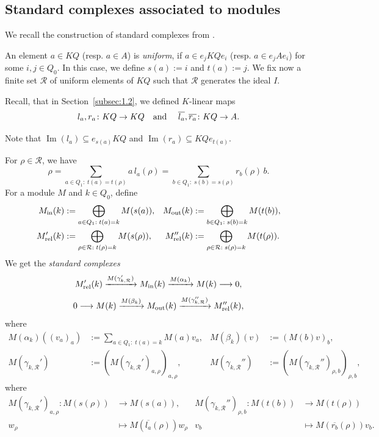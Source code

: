 \documentclass[12pt,reqno]{amsart}
\theoremstyle{definition}
\newcommand{\df}{\colon}
\newcommand{\cR}{{\mathcal R}}
\newcommand{\Ima}{\operatorname{Im}}
\begin{document}
\subsection{Standard complexes associated to modules}
We recall the construction of standard complexes from \cite{GHLS26}.

An element $a \in KQ$ (resp. $a \in A$) is \emph{uniform}, if $a \in e_jKQe_i$ (resp. $a \in e_jAe_i$) for
some $i,j \in Q_0$.
In this case, we define $s(a) := i$ and $t(a) := j$.
We fix now a finite set
$
\cR
$ of uniform elements of $KQ$ such that $\cR$ generates the ideal $I$.

Recall, that in Section~\ref{subsec:1.2}, we defined $K$-linear maps
$$
l_a,r_a\df KQ \to KQ
\text{\quad and \quad}
\overline{l_a},\overline{r_a}\df KQ \to A.
$$

Note that $\Ima(l_a) \subseteq  e_{s(a)}KQ$ and 
$\Ima(r_a) \subseteq KQe_{t(a)}$.

For $\rho \in \cR$, we have
\[
\rho = \sum_{a \in Q_1 : \; t(a)=t(\rho)} a\,l_a(\rho)
= \sum_{b \in Q_1 : \; s(b)=s(\rho)} r_b(\rho)\,b.
\]
For a module $M$ and $k \in Q_0$, define
\[
\begin{aligned}
M_{\rm in}(k)
&:= \bigoplus_{a \in Q_1 : \; t(a)=k} M(s(a)),
&
M_{\rm out}(k)
&:= \bigoplus_{b \in Q_1 : \; s(b)=k} M(t(b)),\\
M'_{\rm rel}(k)
&:= \bigoplus_{\rho \in \cR : \; t(\rho)=k} M(s(\rho)),
&
M''_{\rm rel}(k)
&:= \bigoplus_{\rho \in \cR : \; s(\rho)=k} M(t(\rho)).
 \end{aligned}
\]
We get the \emph{standard complexes} 
\[
 M_{\rm rel}'(k)\xrightarrow{M(\gamma_{k,\cR}')}
 M_{\rm in}(k)\xrightarrow{M(\alpha_k)}M(k)\longrightarrow0,
\]
\[
 0\longrightarrow M(k)\xrightarrow{M(\beta_k)}
 M_{\rm out}(k)\xrightarrow{M(\gamma_{k,\cR}'')}M_{\rm rel}''(k),
\]
where
\begin{align*}
 M(\alpha_k)((v_a)_a)&:=\sum_{a \in Q_1 : \; t(a)=k}M(a)v_a,
 &M(\beta_k)(v)&:=(M(b)v)_{b},
\\
M(\gamma_{k,\cR}') &:=   (M(\gamma_{k,\cR}')_{a,\rho})_{a,\rho},
&
M(\gamma_{k,\cR}'') &:=   (M(\gamma_{k,\cR}'')_{\rho,b})_{\rho,b},
\end{align*}
where 
\begin{align*}
M(\gamma_{k,\cR}')_{a,\rho}\df M(s(\rho)) &\to M(s(a)),
&
M(\gamma_{k,\cR}'')_{\rho,b}\df M(t(b)) &\to M(t(\rho))
\\
w_\rho &\mapsto M(\overline{l_a}(\rho))w_\rho
&
v_b  &\mapsto M(\overline{r_b}(\rho))v_b.
\end{align*}
\end{document}
